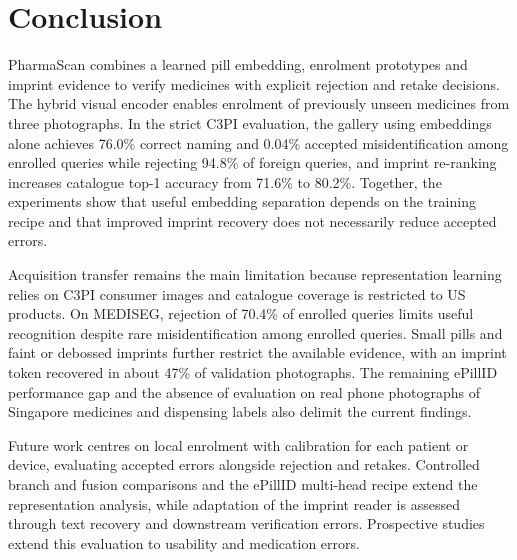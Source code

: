 \section{Conclusion}
PharmaScan combines a learned pill embedding, enrolment prototypes and imprint evidence to verify medicines with explicit rejection and retake decisions. The hybrid visual encoder enables enrolment of previously unseen medicines from three photographs. In the strict C3PI evaluation, the gallery using embeddings alone achieves 76.0\% correct naming and 0.04\% accepted misidentification among enrolled queries while rejecting 94.8\% of foreign queries, and imprint re-ranking increases catalogue top-1 accuracy from 71.6\% to 80.2\%. Together, the experiments show that useful embedding separation depends on the training recipe and that improved imprint recovery does not necessarily reduce accepted errors.

Acquisition transfer remains the main limitation because representation learning relies on C3PI consumer images and catalogue coverage is restricted to US products. On MEDISEG, rejection of 70.4\% of enrolled queries limits useful recognition despite rare misidentification among enrolled queries. Small pills and faint or debossed imprints further restrict the available evidence, with an imprint token recovered in about 47\% of validation photographs. The remaining ePillID performance gap and the absence of evaluation on real phone photographs of Singapore medicines and dispensing labels also delimit the current findings.

Future work centres on local enrolment with calibration for each patient or device, evaluating accepted errors alongside rejection and retakes. Controlled branch and fusion comparisons and the ePillID multi-head recipe extend the representation analysis, while adaptation of the imprint reader is assessed through text recovery and downstream verification errors. Prospective studies extend this evaluation to usability and medication errors.
